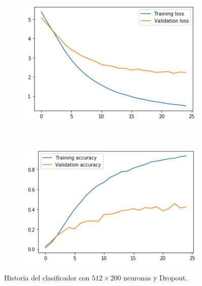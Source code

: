 \documentclass[11pt,a4paper]{article}
\begin{document}
\begin{figure}[H]
  \centering
  \begin{subfigure}{.5\textwidth}
    \centering
    \includegraphics[scale=0.4]{img/feat-m2drop-loss.png}
    \label{fig:feat-m2drop-loss}
  \end{subfigure}%
  ~ \quad
  \begin{subfigure}{.5\textwidth}
    \centering
    \includegraphics[scale=0.4]{img/feat-m2drop-acc.png}
    \label{fig:feat-m2drop-acc}
  \end{subfigure}
  \caption{Historia del clasificador con $512 \times 200$ neuronas y Dropout.}
  \label{fig:history-feat-m2drop}
\end{figure}
\end{document}
